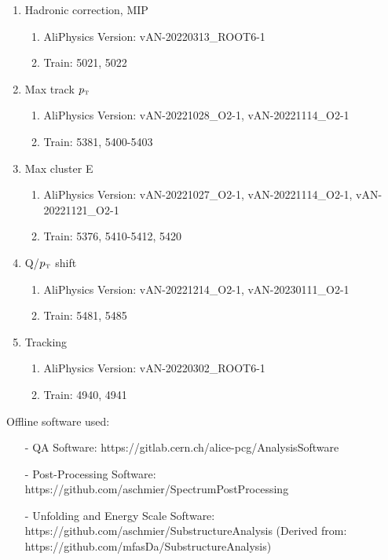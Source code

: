 \documentclass[ALICE]{ALICE_analysis_notes}
\newcommand{\pT}{$p_{\mbox{\tiny T}}$\xspace}
\begin{document}
\begin{appendix}
\begin{enumerate}
    \item Hadronic correction, MIP
    \begin{enumerate}
        \item AliPhysics Version: vAN-20220313\_ROOT6-1
        \item Train: 5021, 5022
    \end{enumerate}
    \item Max track \pT
    \begin{enumerate}
        \item AliPhysics Version: vAN-20221028\_O2-1, vAN-20221114\_O2-1
        \item Train: 5381, 5400-5403
    \end{enumerate}
    \item Max cluster E
    \begin{enumerate}
        \item AliPhysics Version: vAN-20221027\_O2-1, vAN-20221114\_O2-1, vAN-20221121\_O2-1
        \item Train: 5376, 5410-5412, 5420
    \end{enumerate}
    \item Q/\pT shift
    \begin{enumerate}
        \item AliPhysics Version: vAN-20221214\_O2-1, vAN-20230111\_O2-1 
        \item Train: 5481, 5485
    \end{enumerate}
    \item Tracking
    \begin{enumerate}
        \item AliPhysics Version: vAN-20220302\_ROOT6-1
        \item Train: 4940, 4941
    \end{enumerate}
\end{enumerate}

Offline software used:
\begin{enumerate}
    \item[-] QA Software: https://gitlab.cern.ch/alice-pcg/AnalysisSoftware
    \item[-] Post-Processing Software: https://github.com/aschmier/SpectrumPostProcessing
    \item[-] Unfolding and Energy Scale Software: https://github.com/aschmier/SubstructureAnalysis (Derived from: https://github.com/mfasDa/SubstructureAnalysis)
\end{enumerate}

\newpage


\end{appendix}
\end{document}
